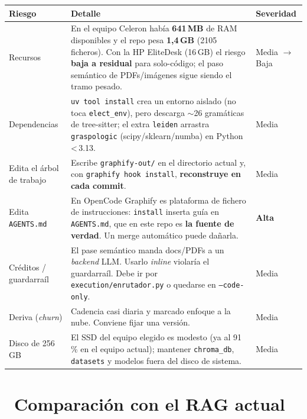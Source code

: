 \documentclass[11pt,a4paper]{article}
\newcommand{\iconotexto}[2]{\textcolor{cyanNeon}{\faIcon{#1}}~#2}
\begin{document}
\begin{longtable}{p{3.3cm} p{8.4cm} p{2.0cm}}
\toprule
\textbf{Riesgo} & \textbf{Detalle} & \textbf{Severidad} \\
\midrule
\endhead
\bottomrule
\endlastfoot
Recursos & En el equipo Celeron había \textbf{641\,MB} de RAM disponibles y el repo pesa
\textbf{1{,}4\,GB} (2105 ficheros). Con la HP EliteDesk (16\,GB) el riesgo \textbf{baja a
residual} para solo-código; el paso semántico de PDFs/imágenes sigue siendo el tramo
pesado. & Media \(\rightarrow\) Baja \\
\addlinespace
Dependencias & \texttt{uv tool install} crea un entorno aislado (no toca
\texttt{elect\_env}), pero descarga \(\sim\)26 gramáticas de tree-sitter; el extra
\texttt{leiden} arrastra \texttt{graspologic} (scipy/sklearn/numba) en Python\,<\,3.13.
& Media \\
\addlinespace
Edita el árbol de trabajo & Escribe \texttt{graphify-out/} en el directorio actual y,
con \texttt{graphify hook install}, \textbf{reconstruye en cada commit}. & Media \\
\addlinespace
Edita \texttt{AGENTS.md} & En OpenCode Graphify es plataforma de fichero de
instrucciones: \texttt{install} inserta guía en \texttt{AGENTS.md}, que en este repo es
\textbf{la fuente de verdad}. Un merge automático puede dañarla. & \textbf{Alta} \\
\addlinespace
Créditos / guardarraíl & El pase semántico manda docs/PDFs a un \emph{backend} LLM. Usarlo
\emph{inline} violaría el guardarraíl. Debe ir por \texttt{execution/enrutador.py} o
quedarse en \texttt{--code-only}. & Media \\
\addlinespace
Deriva (\emph{churn}) & Cadencia casi diaria y marcado enfoque a la nube. Conviene fijar
una versión. & Media \\
\addlinespace
Disco de 256\,GB & El SSD del equipo elegido es modesto (ya al 91\,\% en el equipo actual);
mantener \texttt{chroma\_db}, \texttt{datasets} y modelos fuera del disco de sistema. &
Media \\
\end{longtable}

\section[Comparación con el RAG]{\iconotexto{search}{Comparación con el RAG actual}}
\end{document}
